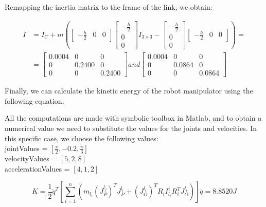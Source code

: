 \documentclass{article}
\begin{document}
Remapping the inertia matrix to the frame of the link, we obtain:

\begin{align}
    I & = I_C + m \left( \begin{bmatrix} -\frac{h}{2} & 0 & 0 \end{bmatrix} \begin{bmatrix} -\frac{h}{2} \\ 0 \\ 0 \end{bmatrix} I_{3 \times 3} - \begin{bmatrix} -\frac{h}{2} \\ 0 \\ 0 \end{bmatrix} \begin{bmatrix} -\frac{h}{2} & 0 & 0 \end{bmatrix} \right) = \nonumber \\
      & = \begin{bmatrix}
              0.0004 & 0      & 0      \\
              0      & 0.2400 & 0      \\
              0      & 0      & 0.2400
          \end{bmatrix} and
    \begin{bmatrix}
        0.0004 & 0      & 0      \\
        0      & 0.0864 & 0      \\
        0      & 0      & 0.0864
    \end{bmatrix}
\end{align}

Finally, we can calculate the kinetic energy of the robot manipulator using the following equation:

All the computations are made with symbolic toolbox in Matlab, and to obtain a numerical value we need to substitute the values for the joints and velocities.
In this specific case, we choose the following values:
\\

jointValues = $[\frac{\pi}{2}, -0.2, \frac{\pi}{3}]$ \\

velocityValues = $[5, 2, 8]$ \\

accelerationValues = $[4, 1, 2]$

\begin{equation}
    K =  \frac{1}{2} \dot{q}^T \left[ \sum_{i=1}^{n} \left( m_{l_i} (J_P^{l_j})^T J_P^{l_i} + (J_O^{l_i})^T R_i I_{l_i}^{i} R_i^T J_O^{l_i} \right) \right] \dot{q} =  8.8520 J
\end{equation}
\end{document}
